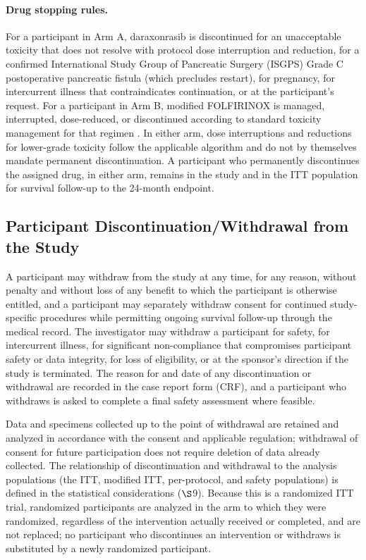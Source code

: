 \clearpage

\paragraph{Drug stopping rules.}
For a participant in Arm A, daraxonrasib is discontinued for an unacceptable
toxicity that does not resolve with protocol dose interruption and reduction, for a
confirmed International Study Group of Pancreatic Surgery (ISGPS) Grade C
postoperative pancreatic fistula \cite{Bassi2017} (which precludes restart), for
pregnancy, for intercurrent illness that contraindicates continuation, or at the
participant's request. For a participant in Arm B, modified FOLFIRINOX is managed,
interrupted, dose-reduced, or discontinued according to standard toxicity
management for that regimen \cite{Conroy2018}. In either arm, dose interruptions and
reductions for lower-grade toxicity follow the applicable algorithm and do not by
themselves mandate permanent discontinuation. A participant who permanently
discontinues the assigned drug, in either arm, remains in the study and in the ITT
population for survival follow-up to the 24-month endpoint.

\subsection{Participant Discontinuation/Withdrawal from the Study}

A participant may withdraw from the study at any time, for any reason, without
penalty and without loss of any benefit to which the participant is otherwise
entitled, and a participant may separately withdraw consent for continued
study-specific procedures while permitting ongoing survival follow-up through the
medical record. The investigator may withdraw a participant for safety, for
intercurrent illness, for significant non-compliance that compromises participant
safety or data integrity, for loss of eligibility, or at the sponsor's direction if
the study is terminated. The reason for and date of any discontinuation or
withdrawal are recorded in the case report form (CRF), and a participant who
withdraws is asked to complete a final safety assessment where feasible.

Data and specimens collected up to the point of withdrawal are retained and analyzed
in accordance with the consent and applicable regulation; withdrawal of consent for
future participation does not require deletion of data already collected. The
relationship of discontinuation and withdrawal to the analysis populations (the
ITT, modified ITT, per-protocol, and safety populations) is defined in the
statistical considerations ($\S$9). Because this is a randomized ITT trial,
randomized participants are analyzed in the arm to which they were randomized,
regardless of the intervention actually received or completed, and are not replaced;
no participant who discontinues an intervention or withdraws is substituted by a
newly randomized participant.

